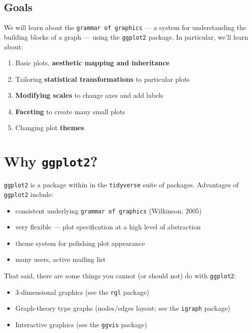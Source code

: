 \documentclass[]{book}
\providecommand{\tightlist}{%
  \setlength{\itemsep}{0pt}\setlength{\parskip}{0pt}}
\begin{document}
\hypertarget{goals-2}{%
\subsection{Goals}\label{goals-2}}

We will learn about the \texttt{grammar\ of\ graphics} --- a system for understanding
the building blocks of a graph --- using the \texttt{ggplot2} package. In particular,
we'll learn about:

\begin{enumerate}
\def\labelenumi{\arabic{enumi}.}
\tightlist
\item
  Basic plots, \textbf{aesthetic mapping and inheritance}
\item
  Tailoring \textbf{statistical transformations} to particular plots
\item
  \textbf{Modifying scales} to change axes and add labels
\item
  \textbf{Faceting} to create many small plots
\item
  Changing plot \textbf{themes}
\end{enumerate}

\hypertarget{why-ggplot2}{%
\section{\texorpdfstring{Why \texttt{ggplot2}?}{Why ggplot2?}}\label{why-ggplot2}}

\texttt{ggplot2} is a package within in the \texttt{tidyverse} suite of packages. Advantages of \texttt{ggplot2} include:

\begin{itemize}
\tightlist
\item
  consistent underlying \texttt{grammar\ of\ graphics} (Wilkinson, 2005)
\item
  very flexible --- plot specification at a high level of abstraction
\item
  theme system for polishing plot appearance
\item
  many users, active mailing list
\end{itemize}

That said, there are some things you cannot (or should not) do with \texttt{ggplot2}:

\begin{itemize}
\tightlist
\item
  3-dimensional graphics (see the \texttt{rgl} package)
\item
  Graph-theory type graphs (nodes/edges layout; see the \texttt{igraph} package)
\item
  Interactive graphics (see the \texttt{ggvis} package)
\end{itemize}
\end{document}
